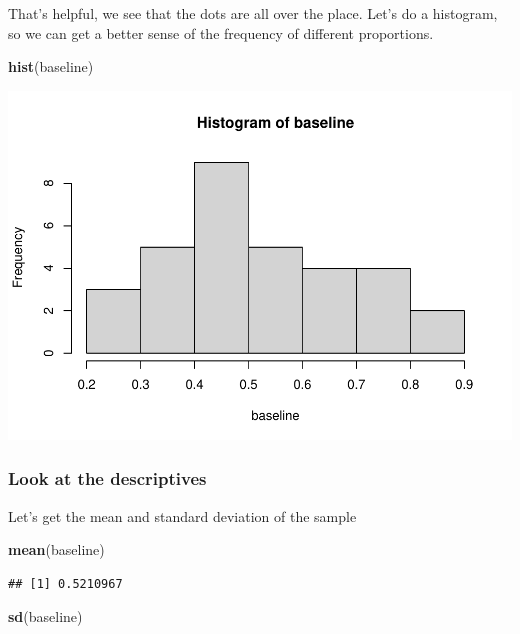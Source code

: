 \documentclass[
]{book}
\newenvironment{Shaded}{\begin{snugshade}}{\end{snugshade}}
\newcommand{\FunctionTok}[1]{\textcolor[rgb]{0.13,0.29,0.53}{\textbf{#1}}}
\newcommand{\NormalTok}[1]{#1}
\begin{document}
That's helpful, we see that the dots are all over the place. Let's do a histogram, so we can get a better sense of the frequency of different proportions.

\begin{Shaded}
\begin{Highlighting}[]
\FunctionTok{hist}\NormalTok{(baseline)}
\end{Highlighting}
\end{Shaded}

\includegraphics{Statistics_Lab_files/figure-latex/unnamed-chunk-167-1.pdf}

\hypertarget{look-at-the-descriptives}{%
\subsubsection{Look at the descriptives}\label{look-at-the-descriptives}}

Let's get the mean and standard deviation of the sample

\begin{Shaded}
\begin{Highlighting}[]
\FunctionTok{mean}\NormalTok{(baseline)}
\end{Highlighting}
\end{Shaded}

\begin{verbatim}
## [1] 0.5210967
\end{verbatim}

\begin{Shaded}
\begin{Highlighting}[]
\FunctionTok{sd}\NormalTok{(baseline)}
\end{Highlighting}
\end{Shaded}
\end{document}
